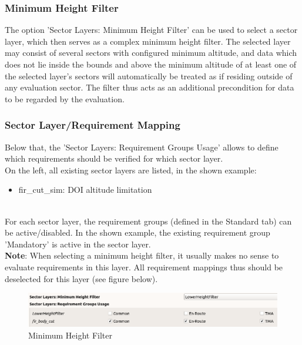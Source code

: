 \subsubsection{Minimum Height Filter}

The option 'Sector Layers: Minimum Height Filter' can be used to select a sector layer, which then serves as a complex minimum height filter.
The selected layer may consist of several sectors with configured minimum altitude, and data which does not lie inside the bounds and above the minimum altitude 
of at least one of the selected layer's sectors will automatically be treated as if residing outside of any evaluation sector. 
The filter thus acts as an additional precondition for data to be regarded by the evaluation.

\subsubsection{Sector Layer/Requirement Mapping}

Below that, the 'Sector Layers: Requirement Groups Usage' allows to define which requirements should be verified for which sector layer. \\

On the left, all existing sector layers are listed, in the shown example:
\begin{itemize}  
\item fir\_cut\_sim: DOI altitude limitation
\end{itemize}
\ \\

For each sector layer, the requirement groups (defined in the Standard tab) can be active/disabled. In the shown example, the existing requirement group 'Mandatory' is active in the sector layer. \\

\textbf{Note}: When selecting a minimum height filter, it usually makes no sense to evaluate requirements in this layer.
All requirement mappings thus should be deselected for this layer (see figure below).

\begin{figure}[H]
  \hspace*{-2cm}
    \includegraphics[width=18cm,frame]{figures/eval_unmap_min_height_filter.png}
  \caption{Minimum Height Filter}
\end{figure}

